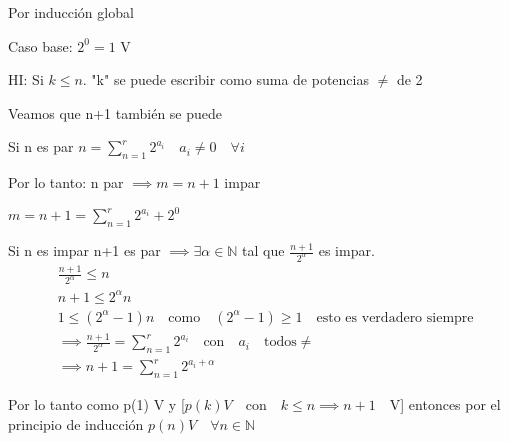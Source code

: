 Por inducción global

Caso base: $2^0 = 1$  V

HI: Si $k\leqslant n$. "k" se puede escribir como suma de potencias $\neq$ de 2

Veamos que n+1 también se puede

Si n es par $n=\sum_{n=1}^{r}2^{a_i}  \quad  a_i \neq0  \quad \forall i$

Por lo tanto: n par $\implies m=n+1$ impar

$m=n+1=\sum_{n=1}^{r}2^{a_i}  + 2^0$

Si n es impar n+1 es par $\implies \exists \alpha \in\mathbb N$ tal que  $\frac{n+1}{2^\alpha}$ es impar.
\begin{align*}
& \frac{n+1}{2^\alpha} \leqslant n \\
& n+1\leqslant 2^\alpha n \\
& 1\leqslant  (2^\alpha -1)n  \quad \text{como} \quad (2^\alpha -1)\geqslant 1 \quad \text {esto es verdadero siempre} \\
& \implies \frac{n+1}{2^\alpha}  = \sum_{n=1}^{r}2^{a_i} \quad \text{con} \quad a_i \quad \text{todos}  \neq \\
& \implies n+1 = \sum_{n=1}^{r}2^{a_i+\alpha} 
\end{align*}

Por lo tanto como p(1) V y [$p(k) V \quad \text{con}\quad k\leqslant n \implies n+1 \quad \text{V}$]  entonces por el principio de inducción $p(n) V \quad \forall  n \in \mathbb N$

